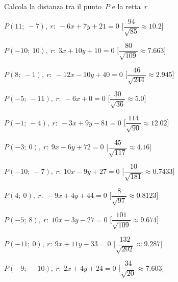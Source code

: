 \begin{esercizio}\label{ese:}
 Calcola la distanza tra il punto~\(P\) e la retta~\(r\)
 \begin{enumeratea}
  \item  \(P(11;~-7),~r:~-6 x + 7 y + 21 = 0\) \hfill 
   [\(\dfrac{94}{\sqrt{85}}\approx  10.2\)]
  \item  \(P(-10;~10),~r:~3 x + 10 y + 10 = 0\) \hfill 
   [\(\dfrac{80}{\sqrt{109}}\approx 7.663\)]
  \item  \(P(8;~-1),~r:~-12 x - 10 y + 40 = 0\) \hfill 
   [\(\dfrac{46}{\sqrt{244}}\approx 2.945\)]
  \item  \(P(-5;~-11),~r:~-6 x + 0 = 0\) \hfill 
   [\(\dfrac{30}{\sqrt{36}}\approx   5.0\)]
  \item  \(P(-1;~-4),~r:~-3 x + 9 y - 81 = 0\) \hfill 
   [\(\dfrac{114}{\sqrt{90}}\approx 12.02\)]
  \item  \(P(-3;~0),~r:~9 x - 6 y + 72 = 0\) \hfill 
   [\(\dfrac{45}{\sqrt{117}}\approx  4.16\)]
  \item  \(P(-10;~-7),~r:~10 x - 9 y + 27 = 0\) \hfill 
   [\(\dfrac{10}{\sqrt{181}}\approx0.7433\)]
  \item  \(P(4;~0),~r:~-9 x + 4 y + 44 = 0\) \hfill 
   [\(\dfrac{8}{\sqrt{97}}\approx0.8123\)]
  \item  \(P(-5;~8),~r:~10 x - 3 y - 27 = 0\) \hfill 
   [\(\dfrac{101}{\sqrt{109}}\approx 9.674\)]
  \item  \(P(-11;~0),~r:~9 x + 11 y - 33 = 0\) \hfill 
   [\(\dfrac{132}{\sqrt{202}}\approx 9.287\)]
  \item  \(P(-9;~-10),~r:~2 x + 4 y + 24 = 0\) \hfill 
   [\(\dfrac{34}{\sqrt{20}}\approx 7.603\)]
 \end{enumeratea}
\end{esercizio}


